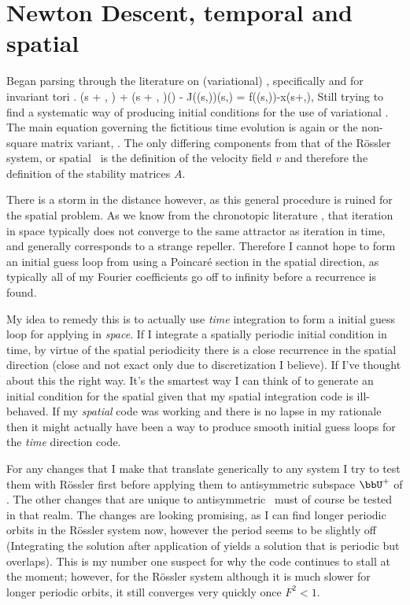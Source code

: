 \section{Newton Descent, temporal and spatial}
Began parsing through the literature on (variational) {\descent},
specifically  and for invariant tori
.
\beq
\frac{\partial \conf}{\partial \tau}(s + \omega, \tau) + (s + \omega, \tau)\frac{\partial \omega}{\partial \tau}(\tau) - J(\conf(s,\tau))\frac{\partial \conf}{\partial \tau}(s,\tau) =
f(\conf (s,\tau))-x(s+\omega,\tau),
Still trying to find a systematic way of producing initial conditions for
the use of variational {\descent}. The main equation governing the
fictitious time evolution is again  or the non-square
matrix variant, . The only differing components
from that of the R\"ossler system, or spatial \KS\ is the definition of
the velocity field $v$ and therefore the definition of the stability
matrices $A$.

There is a storm in the distance however, as this general procedure is ruined for the spatial problem.
As we know from the chronotopic literature ,
that iteration in space typically does not converge to the same attractor as iteration in time,
and generally corresponds to a strange repeller. Therefore I cannot hope to form an initial
guess loop from using a Poincar\'e section in the spatial direction, as typically all of my
Fourier coefficients go off to infinity before a recurrence is found.

My idea to remedy this is to actually use \emph{time} integration to form a
initial guess loop for applying {\descent} in \emph{space}. If I integrate a spatially
periodic initial condition in time, by virtue of the spatial periodicity there is a
close recurrence in the spatial direction (close and not exact only due to discretization I believe).
If I've thought about this the right way. It's the smartest way I can think of to
generate an initial condition for the spatial {\descent}  given
that my spatial integration code is ill-behaved. If my \emph{spatial} code was
working and there is no lapse in my rationale then it might actually have been
a way to produce smooth initial guess loops for the \emph{time} direction {\descent} code.

For any changes that I make that translate generically to
any system I try to test them with R\"ossler first before applying them
to antisymmetric subspace $\bbU^+$ of \KS. The other changes that are
unique to antisymmetric \KS\ must of course be tested in that realm. The
changes are looking promising, as I can find longer periodic orbits in
the R\"ossler system now, however the period seems to be slightly off
(Integrating the solution after application of {\descent} yields a
solution that is periodic but overlaps). This is my number one suspect
for why the {\descent} code continues to stall at the moment; however,
for the R\"ossler system although it is much slower for longer periodic
orbits, it still converges very quickly once $F^2 < 1$.

